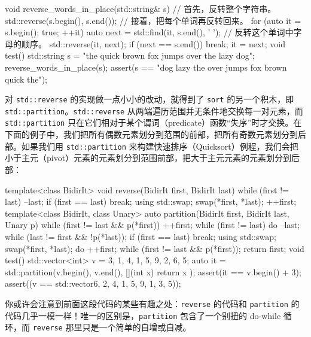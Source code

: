 \begin{codebox}[cpp]
     void reverse_words_in_place(std::string& s)
     {
       // 首先，反转整个字符串。
       std::reverse(s.begin(), s.end());
       // 接着，把每个单词再反转回来。
       for (auto it = s.begin(); true; ++it) {
         auto next = std::find(it, s.end(), ' ');
         // 反转这个单词中字母的顺序。
         std::reverse(it, next);
         if (next == s.end()) {
           break;
         }
         it = next;
       }
     }
     void test()
     {
       std::string s = "the quick brown fox jumps over the lazy dog";
       reverse_words_in_place(s);
       assert(s == "dog lazy the over jumps fox brown quick the");
     }
\end{codebox}

对 \texttt{std::\allowbreak{}reverse} 的实现做一点小小的改动，就得到了 \texttt{sort} 的另一个积木，即 \texttt{std::\allowbreak{}partition}。\texttt{std::\allowbreak{}reverse} 从两端遍历范围并无条件地交换每一对元素，而 \texttt{std::\allowbreak{}partition} 只在它们相对于某个谓词（predicate）函数“失序”时才交换。在下面的例子中，我们把所有偶数元素划分到范围的前部，把所有奇数元素划分到后部。如果我们用 \texttt{std::\allowbreak{}partition} 来构建快速排序（Quicksort）例程，我们会把小于主元（pivot）元素的元素划分到范围前部，把大于主元元素的元素划分到后部：

\begin{codebox}[cpp]
     template<class BidirIt>
     void reverse(BidirIt first, BidirIt last)
     {
       while (first != last) {
         --last;
         if (first == last) break;
         using std::swap;
         swap(*first, *last);
         ++first;
       }
     }
     template<class BidirIt, class Unary>
     auto partition(BidirIt first, BidirIt last, Unary p)
     {
       while (first != last && p(*first)) {
         ++first;
       }
       while (first != last) {
         do {
           --last;
         } while (last != first && !p(*last));
         if (first == last) break;
         using std::swap;
         swap(*first, *last);
         do {
           ++first;
         } while (first != last && p(*first));
       }
       return first;
     }
     void test()
     {
       std::vector<int> v = {3, 1, 4, 1, 5, 9, 2, 6, 5};
       auto it = std::partition(v.begin(), v.end(), [](int x) {
         return x %
       });
       assert(it == v.begin() + 3);
       assert((v == std::vector{6, 2, 4, 1, 5, 9, 1, 3, 5}));
     }
\end{codebox}

你或许会注意到前面这段代码的某些有趣之处：\texttt{reverse} 的代码和 \texttt{partition} 的代码几乎一模一样！唯一的区别是，\texttt{partition} 包含了一个别扭的 do-while 循环，而 \texttt{reverse} 那里只是一个简单的自增或自减。

